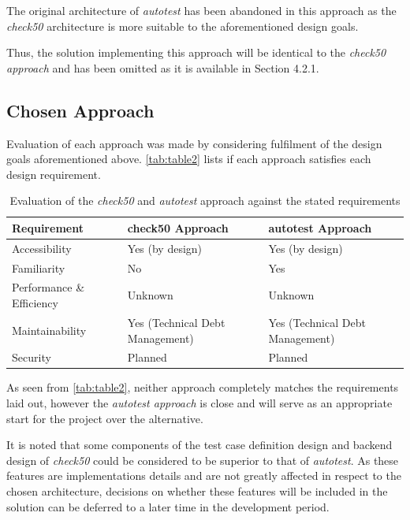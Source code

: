 \documentclass[hidelinks]{report}
\begin{document}
The original architecture of \textit{autotest} has been abandoned in this approach as the \textit{check50} architecture is more suitable to the aforementioned design goals.

Thus, the solution implementing this approach will be identical to the \textit{check50 approach} and has been omitted as it is available in Section 4.2.1.

\subsection{Chosen Approach}

Evaluation of each approach was made by considering fulfilment of the design goals aforementioned above. \autoref{tab:table2} lists if each approach satisfies each design requirement.

\begin{table}[h]
	\centering
	\begin{tabular}{lll}
		\toprule
		\textbf{Requirement} & \textbf{check50 Approach} & \textbf{autotest Approach} \\
		\midrule
		Accessibility    & Yes (by design) & Yes (by design) \\
		Familiarity      & No  & Yes \\
		Performance \& Efficiency & Unknown & Unknown \\
		Maintainability  & Yes (Technical Debt Management) & Yes (Technical Debt Management) \\
		Security 		 & Planned & Planned \\
		\bottomrule
	\end{tabular}
	\caption{Evaluation of the \textit{check50} and \textit{autotest} approach against the stated requirements}
	\label{tab:table2}
\end{table}

As seen from \autoref{tab:table2}, neither approach completely matches the requirements laid out, however the \textit{autotest approach} is close and will serve as an appropriate start for the project over the alternative.

It is noted that some components of the test case definition design and backend design of \textit{check50} could be considered to be superior to that of \textit{autotest}. As these features are implementations details and are not greatly affected in respect to the chosen architecture, decisions on whether these features will be included in the solution can be deferred to a later time in the development period.
\end{document}
